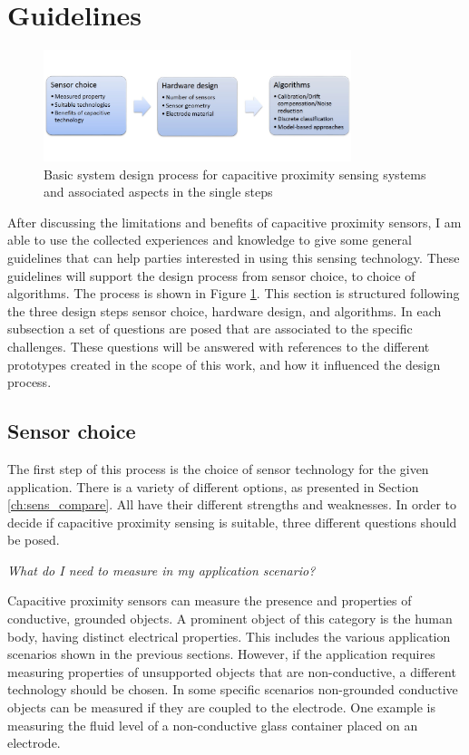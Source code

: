 \section{Guidelines}
\begin{figure}[ht]
\centering
\includegraphics[width=0.8\textwidth]{images/guide_process}
\caption{Basic system design process for capacitive proximity sensing systems and associated aspects in the single steps}
\label{fig:guide_process}
\end{figure}

After discussing the limitations and benefits of capacitive proximity sensors, I am able to use the collected experiences and knowledge to give some general guidelines that can help parties interested in using this sensing technology. These guidelines will support the design process from sensor choice, to choice of algorithms. The process is shown in Figure \ref{fig:guide_process}. This section is structured following the three design steps sensor choice, hardware design, and algorithms. In each subsection a set of questions are posed that are associated to the specific challenges. These questions will be answered with references to the different prototypes created in the scope of this work, and how it influenced the design process.
 
\subsection{Sensor choice}
The first step of this process is the choice of sensor technology for the given application. There is a variety of different options, as presented in Section \ref{ch:sens_compare}. All have their different strengths and weaknesses. In order to decide if capacitive proximity sensing is suitable, three different questions should be posed.

\textit{What do I need to measure in my application scenario?
}

Capacitive proximity sensors can measure the presence and properties of conductive, grounded objects. A prominent object of this category is the human body, having distinct electrical properties. This includes the various application scenarios shown in the previous sections. However, if the application requires measuring properties of unsupported objects that are non-conductive, a different technology should be chosen. In some specific scenarios non-grounded conductive objects can be measured if they are coupled to the electrode. One example is measuring the fluid level of a non-conductive glass container placed on an electrode.

